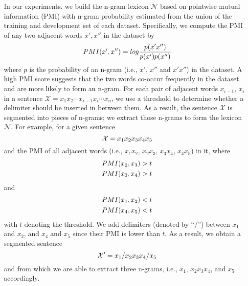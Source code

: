 \documentclass[11pt,a4paper]{article}
\begin{document}
In our experiments, we build the n-gram lexicon $\mathcal{N}$ based on pointwise mutual information (PMI)
with n-gram probability estimated from the union of the training and development set of each dataset.
Specifically, we compute the PMI of any two adjacent words $x', x''$ in the dataset by
\begin{equation}
\setlength\abovedisplayskip{5pt}
\setlength\belowdisplayskip{5pt}
    PMI(x', x'') = log \frac{p(x'x'')}{p(x')p(x'')}
\end{equation}
where $p$ is the probability of an n-gram (i.e., $x'$, $x''$ and $x'x''$) in the dataset.
A high PMI score suggests that the two words co-occur frequently in the dataset and are more likely to form an n-gram.
For each pair of adjacent words $x_{i-1}$, $x_{i}$ in a sentence $\mathcal{X}=x_1x_2 \cdots x_{i-1}x_{i} \cdots x_{n}$, we use a threshold to determine whether a delimiter should be inserted in between them.
As a result, the sentence $\mathcal{X}$ is segmented into pieces of n-grams; we extract those n-grams to form the lexicon $\mathcal{N}$.
For example, for a given sentence
\begin{equation}
\setlength\abovedisplayskip{5pt}
\setlength\belowdisplayskip{5pt}
    \mathcal{X}=x_1 x_2 x_3 x_4 x_5
\end{equation}
and the PMI of all adjacent words (i.e., $x_1 x_2$, $x_2 x_3$, $x_3 x_4$, $x_4 x_5$) in it, where
\begin{align}
\setlength\abovedisplayskip{5pt}
\setlength\belowdisplayskip{5pt}
    PMI(x_2, x_3) > t \\
    PMI(x_3, x_4) > t
\end{align}
and 
\begin{align}
\setlength\abovedisplayskip{5pt}
\setlength\belowdisplayskip{5pt}
    PMI(x_1, x_2) < t \\
    PMI(x_4, x_5) < t
\end{align}
with $t$ denoting the threshold.
We add delimiters (denoted by ``/'') between $x_1$ and $x_2$, and $x_4$ and $x_5$ since their PMI is lower than $t$.
As a result, we obtain a segmented sentence
\begin{equation}
\setlength\abovedisplayskip{5pt}
\setlength\belowdisplayskip{5pt}
    \mathcal{X}'=x_1 / x_2 x_3 x_4 / x_5
\end{equation}
and from which we are able to extract three n-grams, i.e., $x_1$, $x_2 x_3 x_4$, and $x_5$ accordingly.
\end{document}
